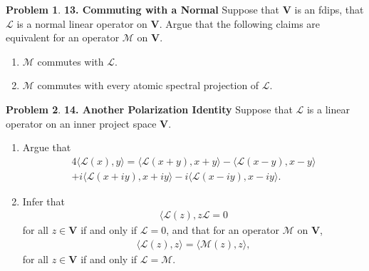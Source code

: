 \documentclass{book}
\theoremstyle{definition}
\newtheorem*{prob*}{Problem}
\newcommand{\V}{\mathbf{V}}
\newcommand{\lag}{\mathcal{L}}
\newcommand{\M}{\mathcal{M}}
\newcommand{\la}{\langle}
\newcommand{\ra}{\rangle}
\begin{document}
\newpage




\begin{prob*}\textbf{13. Commuting with a Normal}
	Suppose that $\V$ is an fdips, that $\lag$ is a normal linear operator on $\V$. Argue that the following claims are equivalent for an operator $\M$ on $\V$.
	\begin{enumerate}
		\item $\M$ commutes with $\lag$. 
		\item $\M$ commutes with every atomic spectral projection of $\lag$. 
	\end{enumerate}
	
\end{prob*}




\newpage




\begin{prob*}\textbf{14. Another Polarization Identity} 
	Suppose that $\lag$ is a linear operator on an inner project space $\V$. 
	\begin{enumerate}
		\item Argue that
		\begin{align*}
		4\la \lag(x),y\ra = \la \lag(x+y), x+y\ra - \la \lag(x-y),x-y \ra \\
		+ i\la\lag(x+iy), x+iy \ra -i \la \lag(x-iy), x-iy \ra.
		\end{align*}
		
		
		\item Infer that
		\begin{align*}
		\la \lag(z) ,z \lag = 0
		\end{align*}
		for all $z\in \V$ if and only if $\lag = 0$, and that for an operator $\M$ on $\V$,
		\begin{align*}
		\la \lag(z),z \ra = \la \M(z),z \ra,
		\end{align*}
		for all $z\in \V$ if and only if $\lag = \M$. 
	\end{enumerate}
	
\end{prob*}



\newpage
\end{document}

